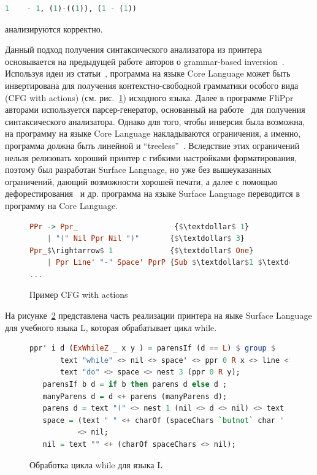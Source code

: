 \begin{lstlisting}[language=Haskell]
   1    - 1, (1)-((1)), (1 - (1))
\end{lstlisting} 

\noindent анализируются корректно.

Данный подход получения синтаксического анализатора из принтера основывается на предыдущей 
работе авторов о grammar-based inversion~\cite{MatsudaPrew}. Используя идеи из статьи~\cite{MatsudaPrew}, 
программа на языке Core Language может быть инвертирована для получения контекстно-свободной 
грамматики особого вида (CFG with actions) (см. рис.~\ref{CFGAct}) исходного языка. 
Далее в программе FliPpr авторами используется парсер-генератор, основанный на работе~\cite{Frost} 
для получения синтаксического анализатора. Однако для того, чтобы инверсия была возможна, 
на программу на языке Core Language накладываются ограничения, а именно, программа должна 
быть линейной и ``treeless''~\cite{WadlerDeforest}. Вследствие этих ограничений нельзя 
релизовать хороший принтер с гибкими настройками форматирования, поэтому был разработан 
Surface Language, но уже без вышеуказанных ограничений, дающий возможности хорошей 
печати, а далее с помощью дефорестирования~\cite{WadlerDeforest} и др. программа на языке 
Surface Language переводится в программу на Core Language.

\begin{figure}[h]
\centering
\begin{lstlisting}[language=Haskell,mathescape]
PPr -> Ppr_                      {$\textdollar$ 1}
    | "(" Nil Ppr Nil ")"       {$\textdollar$ 3} 
Ppr_$\rightarrow$ 1             {$\textdollar$ One}
    | Ppr Line' "-" Space' PprP {Sub $\textdollar$1 $\textdollar$5 }
...    
\end{lstlisting}
\caption{Пример CFG with actions}
\label{CFGAct}
\end{figure}

На рисунке~\ref{LFliPpr} представлена часть реализации принтера на яыке Surface Language для учебного 
языка L, которая обрабатывает цикл while.

\begin{figure}[ht]
\centering
\begin{lstlisting}[language=Haskell]
   ppr' i d (ExWhileZ _ x y ) = parensIf (d == L) $ group $ 
       text "while" <> nil <> space' <> ppr 0 R x <> line <> 
       text "do" <> space <> nest 3 (ppr 0 R y);                                                
   parensIf b d = if b then parens d else d ;
   manyParens d = d <+ parens (manyParens d);
   parens d = text "(" <> nest 1 (nil <> d <> nil) <> text ")";
   space = (text " " <+ charOf (spaceChars `butnot` char ' ')) 
           <> nil;
   nil = text "" <+ (charOf spaceChars <> nil);
\end{lstlisting}
\caption{Обработка цикла while для языка L}
\label{LFliPpr}
\end{figure}

